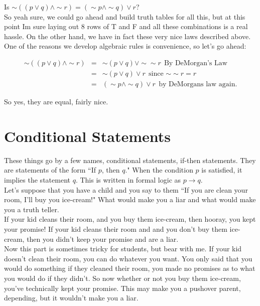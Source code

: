 \begin{example}
Is $\sim((p \vee q)\wedge \sim r)=(\sim p \wedge \sim q )\vee r$?\\

So yeah sure, we could go ahead and build truth tables for all this, but at this point Im sure laying out 8 rows of T and F and all these combinations is a real hassle.  On the other hand, we have in fact these very nice laws described above.  One of the reasons we develop algebraic rules is convenience, so let's go ahead:

\begin{eqnarray*}
\sim((p \vee q)\wedge \sim r)&=&\sim(p \vee q)\vee \sim\sim r\ \ \text{By DeMorgan's Law}\\
&=&\sim(p \vee q)\vee r \ \ \text{since $\sim\sim r=r$}\\
&=&(\sim p \wedge \sim q )\vee r \ \ \text{by DeMorgans law again.}
\end{eqnarray*}

So yes, they are equal, fairly nice.
\end{example}



\section{Conditional Statements}\label{Section:ConditionalStatements}

These things go by a few names, conditional statements, if-then statements.  They are statements of the form ``If $p$, then $q$."  When the condition $p$ is satisfied, it implies the statement $q$.  This is written in formal logic as $p\to q.$\\


Let's suppose that you have a child and you say to them ``If you are clean your room, I'll buy you ice-cream!"  What would make you a liar and what would make you a truth teller.\\

If your kid cleans their room, and you buy them ice-cream, then hooray, you kept your promise!  If your kid cleans their room and and you don't buy them ice-cream, then you didn't keep your promise and are a liar.\\

Now this part is sometimes tricky for students, but bear with me.  If your kid doesn't clean their room, you can do whatever you want.  You only said that you would do something if they cleaned their room, you made no promises as to what you would do if they didn't.  So now whether or not you buy them ice-cream, you've technically kept your promise.  This may make you a pushover parent, depending, but it wouldn't make you a liar.\\


